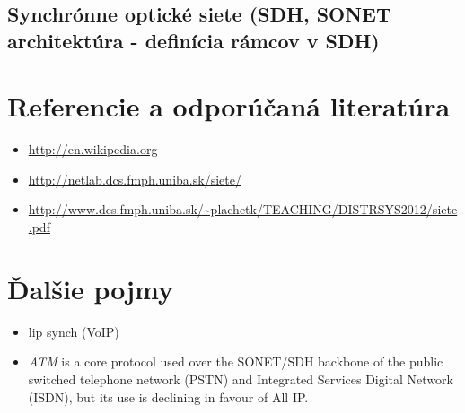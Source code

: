\documentclass[10pt,a4paper]{article}
\begin{document}
\subsection{Synchrónne optické siete (SDH, SONET architektúra - definícia rámcov v SDH)}



\section{Referencie a odporúčaná literatúra}
\begin{itemize}                                
\item \url{http://en.wikipedia.org} 
\item \url{http://netlab.dcs.fmph.uniba.sk/siete/} 
\item \url{http://www.dcs.fmph.uniba.sk/\~plachetk/TEACHING/DISTRSYS2012/siete.pdf} 
\end{itemize}

\section{Ďalšie pojmy}
\begin{itemize}
\item lip synch (VoIP)                                  
\item \emph{ATM} is a core protocol used over the SONET/SDH backbone of the public switched telephone network (PSTN) and Integrated Services Digital Network (ISDN), but its use is declining in favour of All IP. 
\end{itemize}
\end{document}
